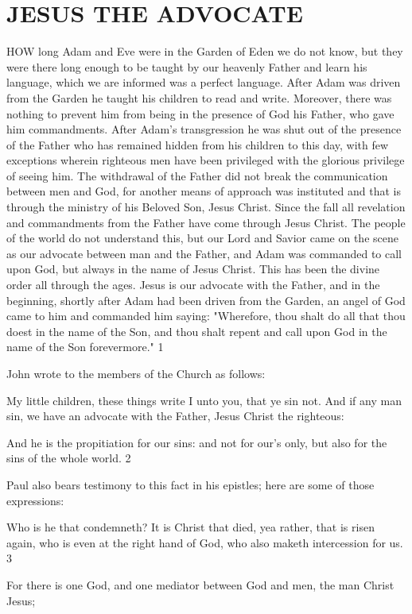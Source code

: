 \chapter{JESUS THE ADVOCATE}
HOW long Adam and Eve were in the Garden of Eden we do not know, but they were there
long enough to be taught by our heavenly Father and learn his language, which we are
informed was a perfect language. After Adam was driven from the Garden he taught his
children to read and write. Moreover, there was nothing to prevent him from being in the
presence of God his Father, who gave him commandments. After Adam's transgression he
was shut out of the presence of the Father who has remained hidden from his children to this
day, with few exceptions wherein righteous men have been privileged with the glorious
privilege of seeing him. The withdrawal of the Father did not break the communication
between men and God, for another means of approach was instituted and that is through the
ministry of his Beloved Son, Jesus Christ. Since the fall all revelation and commandments
from the Father have come through Jesus Christ. The people of the world do not understand
this, but our Lord and Savior came on the scene as our advocate between man and the Father,
and Adam was commanded to call upon God, but always in the name of Jesus Christ. This
has been the divine order all through the ages. Jesus is our advocate with the Father, and in
the beginning, shortly after Adam had been driven from the Garden, an angel of God came to
him and commanded him saying: "Wherefore, thou shalt do all that thou doest in the name of
the Son, and thou shalt repent and call upon God in the name of the Son forevermore." 1

John wrote to the members of the Church as follows:

My little children, these things write I unto you, that ye sin not. And if any man sin, we have
an advocate with the Father, Jesus Christ the righteous:

And he is the propitiation for our sins: and not for our's only, but also for the sins of the
whole world. 2

Paul also bears testimony to this fact in his epistles; here are some of those expressions:

Who is he that condemneth? It is Christ that died, yea rather, that is risen again, who is even
at the right hand of God, who also maketh intercession for us. 3

For there is one God, and one mediator between God and men, the man Christ Jesus;


